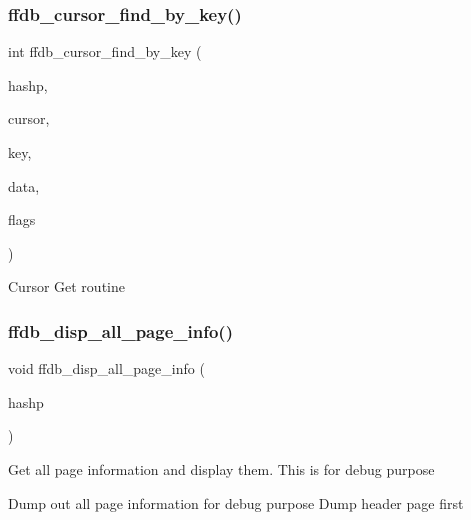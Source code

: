 \subsubsection{\texorpdfstring{ffdb\_cursor\_find\_by\_key()}{ffdb\_cursor\_find\_by\_key()}}
{\footnotesize\ttfamily int ffdb\+\_\+cursor\+\_\+find\+\_\+by\+\_\+key (\begin{DoxyParamCaption}\item[{\mbox{\hyperlink{adat-devel_2other__libs_2filedb_2filehash_2ffdb__hash_8h_ae592010ed2bedc975d3cc0b7d074b9d1}{ffdb\+\_\+htab\+\_\+t}} $\ast$}]{hashp,  }\item[{\mbox{\hyperlink{adat-devel_2other__libs_2filedb_2filehash_2ffdb__hash_8h_a103d84beefb6d7306cb252c4d7f25479}{ffdb\+\_\+crs\+\_\+t}} $\ast$}]{cursor,  }\item[{\mbox{\hyperlink{adat-devel_2other__libs_2filedb_2filehash_2ffdb__db_8h_aa2e0984399491df0fdd20898ca8758f9}{F\+F\+D\+B\+\_\+\+D\+BT}} $\ast$}]{key,  }\item[{\mbox{\hyperlink{adat-devel_2other__libs_2filedb_2filehash_2ffdb__db_8h_aa2e0984399491df0fdd20898ca8758f9}{F\+F\+D\+B\+\_\+\+D\+BT}} $\ast$}]{data,  }\item[{unsigned int}]{flags }\end{DoxyParamCaption})}

Cursor Get routine \mbox{\label{adat-devel_2other__libs_2filedb_2filehash_2ffdb__hash_8h_ac254808e8682b803227a95d1af805d24}} 
\subsubsection{\texorpdfstring{ffdb\_disp\_all\_page\_info()}{ffdb\_disp\_all\_page\_info()}}
{\footnotesize\ttfamily void ffdb\+\_\+disp\+\_\+all\+\_\+page\+\_\+info (\begin{DoxyParamCaption}\item[{\mbox{\hyperlink{adat-devel_2other__libs_2filedb_2filehash_2ffdb__hash_8h_ae592010ed2bedc975d3cc0b7d074b9d1}{ffdb\+\_\+htab\+\_\+t}} $\ast$}]{hashp }\end{DoxyParamCaption})}

Get all page information and display them. This is for debug purpose

Dump out all page information for debug purpose Dump header page first

